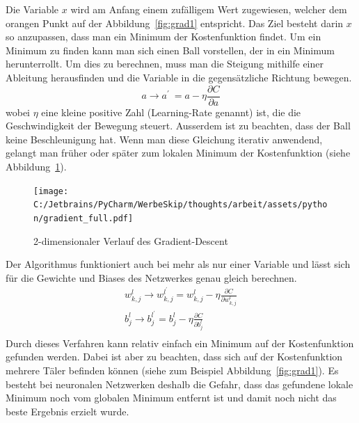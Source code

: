 \documentclass[12pt,a4paper]{report}
\begin{document}
Die Variable $x$ wird am Anfang einem zufälligem Wert zugewiesen,
welcher dem orangen Punkt auf der Abbildung~\ref{fig:grad1} entspricht.
Das Ziel besteht darin $x$ so anzupassen,
dass man ein Minimum der Kostenfunktion findet.
Um ein Minimum zu finden kann man sich einen Ball vorstellen, der in ein Minimum herunterrollt.
Um dies zu berechnen, muss man die Steigung mithilfe einer Ableitung herausfinden und die Variable in die
gegensätzliche Richtung bewegen.
\[a \rightarrow a^\prime\ = a - \eta\frac{\partial C}{\partial a}\]
wobei $\eta$ eine kleine positive Zahl (Learning-Rate genannt) ist, die die Geschwindigkeit der Bewegung steuert.
Ausserdem ist zu beachten, dass der Ball keine Beschleunigung hat.
Wenn man diese Gleichung iterativ anwendend, gelangt man früher oder später zum lokalen Minimum der Kostenfunktion (siehe Abbildung~\ref{fig:grad2}).

\begin{figure}[!h]%
    \centering
    \texttt{[image: C:/Jetbrains/PyCharm/WerbeSkip/thoughts/arbeit/assets/python/gradient\_full.pdf]} %
    \caption{2-dimensionaler Verlauf des Gradient-Descent}%
    \label{fig:grad2}%
\end{figure}

Der Algorithmus funktioniert auch bei mehr als nur einer Variable und lässt sich für die Gewichte und Biases des Netzwerkes genau gleich berechnen.
\begin{gather*}
    w^l_{k,j} \rightarrow w^{l^\prime}_{k,j} = w^l_{k,j} - \eta\frac{\partial C}{\partial w^l_{k,j}}\\
    b^l_j \rightarrow b^{l^\prime}_j = b^l_j - \eta\frac{\partial C}{\partial b^l_j}\\
\end{gather*}
Durch dieses Verfahren kann relativ einfach ein Minimum auf der Kostenfunktion gefunden werden.
Dabei ist aber zu beachten, dass sich auf der Kostenfunktion mehrere Täler befinden können (siehe zum Beispiel Abbildung~\ref{fig:grad1}).
Es besteht bei neuronalen Netzwerken deshalb die Gefahr, dass das gefundene lokale Minimum noch vom globalen Minimum entfernt ist und
damit noch nicht das beste Ergebnis erzielt wurde.
\end{document}
